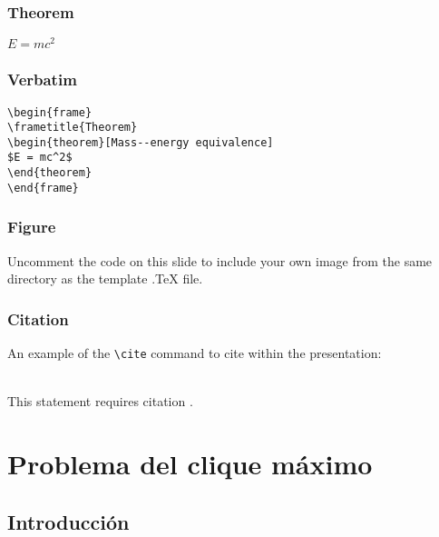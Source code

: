 \documentclass{beamer}
\begin{document}
\begin{frame}
\frametitle{Theorem}
\begin{theorem}
$E = mc^2$
\end{theorem}
\end{frame}


\begin{frame}[fragile] %
\frametitle{Verbatim}
\begin{example}
\begin{verbatim}
\begin{frame}
\frametitle{Theorem}
\begin{theorem}[Mass--energy equivalence]
$E = mc^2$
\end{theorem}
\end{frame}\end{verbatim}
\end{example}
\end{frame}


\begin{frame}
\frametitle{Figure}
Uncomment the code on this slide to include your own image from the same directory as the template .TeX file.
\end{frame}


\begin{frame}[fragile] %
\frametitle{Citation}
An example of the \verb|\cite| command to cite within the presentation:\\~

This statement requires citation \cite{p1}.
\end{frame}

\section{Problema del clique máximo}

\subsection{Introducción}
\end{document}

